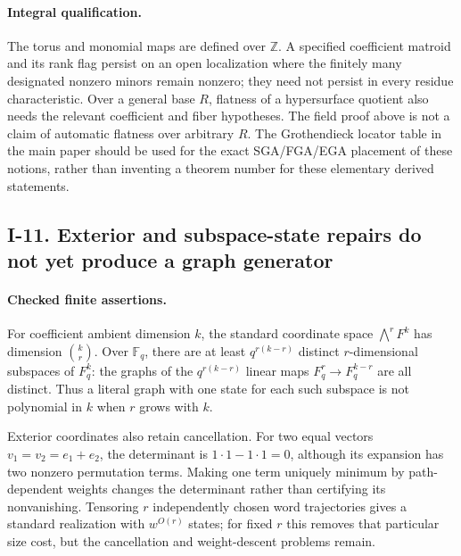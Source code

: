 \paragraph{Integral qualification.}
The torus and monomial maps are defined over $\mathbb Z$.
A specified coefficient matroid and its rank flag persist on an
open localization where the finitely many designated nonzero
minors remain nonzero; they need not persist in every residue
characteristic.  Over a general base $R$, flatness of a
hypersurface quotient also needs the relevant coefficient and
fiber hypotheses.  The field proof above is not a claim of
automatic flatness over arbitrary $R$.  The Grothendieck locator
table in the main paper should be used for the exact SGA/FGA/EGA
placement of these notions, rather than inventing a theorem
number for these elementary derived statements.

\subsection{I-11. Exterior and subspace-state repairs do not yet produce a graph generator}
\label{I-11}

\paragraph{Checked finite assertions.}
For coefficient ambient dimension $k$, the standard coordinate
space $\bigwedge^rF^k$ has dimension $\binom kr$.  Over
$\mathbb F_q$, there are at least $q^{r(k-r)}$ distinct
$r$-dimensional subspaces of $F_q^k$: the graphs of the
$q^{r(k-r)}$ linear maps $F_q^r\to F_q^{k-r}$ are all distinct.
Thus a literal graph with one state for each such subspace is
not polynomial in $k$ when $r$ grows with $k$.

Exterior coordinates also retain cancellation.  For two equal
vectors $v_1=v_2=e_1+e_2$, the determinant is
$1\cdot1-1\cdot1=0$, although its expansion has two nonzero
permutation terms.  Making one term uniquely minimum by
path-dependent weights changes the determinant rather than
certifying its nonvanishing.  Tensoring $r$ independently chosen
word trajectories gives a standard realization with $w^{O(r)}$
states; for fixed $r$ this removes that particular size cost,
but the cancellation and weight-descent problems remain.

